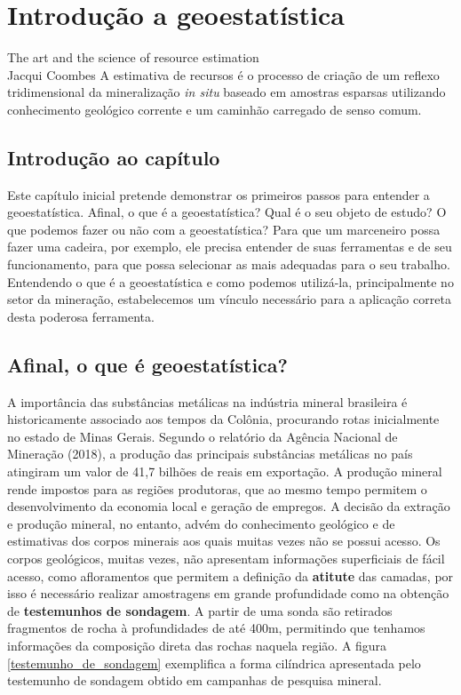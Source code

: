 

\chapter{Introdução a geoestatística}
 
\begin{myquoting}{The art and the science of resource estimation\\Jacqui Coombes}
	A estimativa de recursos é o processo de criação de um reflexo tridimensional da mineralização \textit{in situ} baseado em amostras esparsas utilizando conhecimento geológico corrente e um caminhão carregado de senso comum.
\end{myquoting}

\section{Introdução ao capítulo} 

Este capítulo inicial pretende demonstrar os primeiros passos para entender a geoestatística. Afinal, o que é a geoestatística? Qual é o seu objeto de estudo?  O que podemos fazer ou não com a geoestatística? Para que um marceneiro possa fazer uma cadeira, por exemplo, ele precisa entender de suas ferramentas e de seu funcionamento, para que possa selecionar as mais adequadas para o seu trabalho. Entendendo o que é a geoestatística e como podemos utilizá-la, principalmente no setor da mineração, estabelecemos um vínculo necessário para a aplicação correta desta poderosa ferramenta.

\section{Afinal, o que é geoestatística?}

A importância das substâncias metálicas na indústria mineral brasileira é historicamente associado aos tempos da Colônia, procurando rotas inicialmente no estado de Minas Gerais. Segundo o relatório da Agência Nacional de Mineração (2018), a produção das principais substâncias metálicas no país atingiram um valor de 41,7 bilhões de reais em exportação.  A produção mineral rende impostos para as regiões produtoras, que ao mesmo tempo permitem o desenvolvimento da economia local e geração de empregos. A decisão da extração e produção mineral, no entanto, advém do conhecimento geológico e de estimativas dos corpos minerais aos quais muitas vezes não se possui acesso. Os corpos geológicos, muitas vezes, não apresentam informações superficiais de fácil acesso, como afloramentos que permitem a definição da \textbf{atitute} das camadas, por isso é necessário realizar amostragens em grande profundidade como na obtenção de \textbf{testemunhos de sondagem}. A partir de uma sonda são retirados fragmentos de rocha à profundidades de até 400m, permitindo que tenhamos informações da composição direta das rochas naquela região. A figura \ref{testemunho_de_sondagem} exemplifica a forma cilíndrica apresentada pelo testemunho de sondagem obtido em campanhas de pesquisa mineral.


